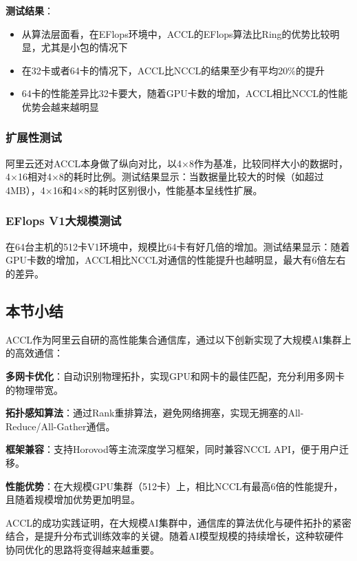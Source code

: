 \textbf{测试结果}：
\begin{itemize}
    \item 从算法层面看，在EFlops环境中，ACCL的EFlops算法比Ring的优势比较明显，尤其是小包的情况下
    \item 在32卡或者64卡的情况下，ACCL比NCCL的结果至少有平均20\%的提升
    \item 64卡的性能差异比32卡要大，随着GPU卡数的增加，ACCL相比NCCL的性能优势会越来越明显
\end{itemize}

\subsubsection{扩展性测试}

阿里云还对ACCL本身做了纵向对比，以4×8作为基准，比较同样大小的数据时，4×16相对4×8的耗时比例。测试结果显示：当数据量比较大的时候（如超过4MB），4×16和4×8的耗时区别很小，性能基本呈线性扩展。

\subsubsection{EFlops V1大规模测试}

在64台主机的512卡V1环境中，规模比64卡有好几倍的增加。测试结果显示：随着GPU卡数的增加，ACCL相比NCCL对通信的性能提升也越明显，最大有6倍左右的差异。

\subsection{本节小结}

ACCL作为阿里云自研的高性能集合通信库，通过以下创新实现了大规模AI集群上的高效通信：

\textbf{多网卡优化}：自动识别物理拓扑，实现GPU和网卡的最佳匹配，充分利用多网卡的物理带宽。

\textbf{拓扑感知算法}：通过Rank重排算法，避免网络拥塞，实现无拥塞的All-Reduce/All-Gather通信。

\textbf{框架兼容}：支持Horovod等主流深度学习框架，同时兼容NCCL API，便于用户迁移。

\textbf{性能优势}：在大规模GPU集群（512卡）上，相比NCCL有最高6倍的性能提升，且随着规模增加优势更加明显。

ACCL的成功实践证明，在大规模AI集群中，通信库的算法优化与硬件拓扑的紧密结合，是提升分布式训练效率的关键。随着AI模型规模的持续增长，这种软硬件协同优化的思路将变得越来越重要。
